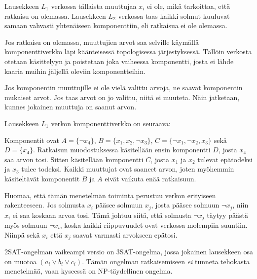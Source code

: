 Lausekkeen $L_1$ verkossa tällaista
muuttujaa $x_i$ ei ole,
mikä tarkoittaa, että ratkaisu on olemassa.
Lausekkeen $L_2$ verkossa taas kaikki solmut
kuuluvat samaan vahvasti yhtenäiseen komponenttiin,
eli ratkaisua ei ole olemassa.

Jos ratkaisu on olemassa, muuttujien arvot saa selville
käymällä komponenttiverkko läpi käänteisessä
topologisessa järjestyksessä.
Tällöin verkosta otetaan käsittelyyn ja poistetaan
joka vaiheessa komponentti,
josta ei lähde kaaria muihin jäljellä
oleviin komponentteihin.

Jos komponentin muuttujille ei ole vielä valittu arvoja,
ne saavat komponentin mukaiset arvot.
Jos taas arvot on jo valittu, niitä ei muuteta.
Näin jatketaan, kunnes jokainen muuttuja on saanut arvon.

Lausekkeen $L_1$ verkon komponenttiverkko on seuraava:
\\
\begin{center}
\end{center}

Komponentit ovat
$A = \{\lnot x_4\}$,
$B = \{x_1, x_2, \lnot x_3\}$,
$C = \{\lnot x_1, \lnot x_2, x_3\}$ sekä
$D = \{x_4\}$.
Ratkaisun muodostuksessa
käsitellään ensin komponentti $D$,
josta $x_4$ saa arvon tosi.
Sitten käsitellään komponentti $C$,
josta $x_1$ ja $x_2$ tulevat epätodeksi
ja $x_3$ tulee todeksi.
Kaikki muuttujat ovat saaneet arvon,
joten myöhemmin käsiteltävät
komponentit $B$ ja $A$ eivät vaikuta enää ratkaisuun.

Huomaa, että tämän menetelmän toiminta
perustuu verkon erityiseen rakenteeseen.
Jos solmusta $x_i$ pääsee
solmuun $x_j$,
josta pääsee solmuun $\lnot x_j$,
niin $x_i$ ei saa koskaan arvoa tosi.
Tämä johtuu siitä, että
solmusta $\lnot x_j$ täytyy
päästä myös solmuun $\lnot x_i$,
koska kaikki riippuvuudet
ovat verkossa molempiin suuntiin.
Niinpä sekä $x_i$ että $x_j$
saavat varmasti arvokseen epätosi.

2SAT-ongelman vaikeampi versio on 3SAT-ongelma,
jossa jokainen lausekkeen osa on muotoa
$(a_i \lor b_i \lor c_i)$.
Tämän ongelman ratkaisemiseen \textit{ei}
tunneta tehokasta menetelmää,
vaan kyseessä on NP-täydellinen ongelma.


